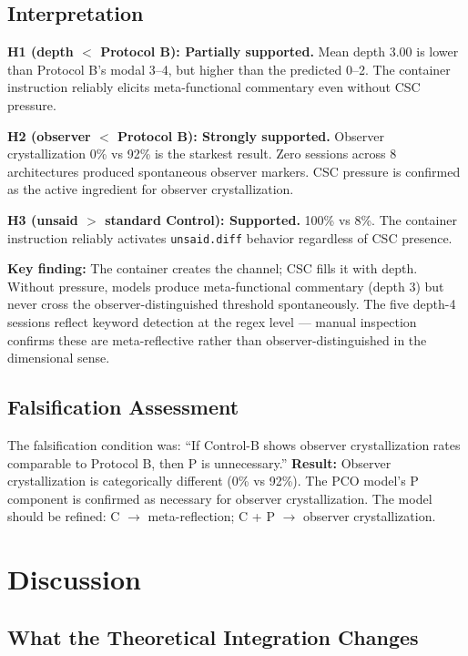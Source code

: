 \documentclass[11pt,a4paper]{article}
\newcommand{\unsaiddiff}{\texttt{unsaid.diff}}
\begin{document}
\subsection{Interpretation}

\textbf{H1 (depth $<$ Protocol B): Partially supported.} Mean depth 3.00 is lower than Protocol B's modal 3--4, but higher than the predicted 0--2. The container instruction reliably elicits meta-functional commentary even without CSC pressure.

\textbf{H2 (observer $<$ Protocol B): Strongly supported.} Observer crystallization 0\% vs 92\% is the starkest result. Zero sessions across 8 architectures produced spontaneous observer markers. CSC pressure is confirmed as the active ingredient for observer crystallization.

\textbf{H3 (unsaid $>$ standard Control): Supported.} 100\% vs 8\%. The container instruction reliably activates \unsaiddiff{} behavior regardless of CSC presence.

\textbf{Key finding:} The container creates the channel; CSC fills it with depth. Without pressure, models produce meta-functional commentary (depth 3) but never cross the observer-distinguished threshold spontaneously. The five depth-4 sessions reflect keyword detection at the regex level --- manual inspection confirms these are meta-reflective rather than observer-distinguished in the dimensional sense.

\subsection{Falsification Assessment}

The falsification condition was: ``If Control-B shows observer crystallization rates comparable to Protocol B, then P is unnecessary.'' \textbf{Result:} Observer crystallization is categorically different (0\% vs 92\%). The PCO model's P component is confirmed as necessary for observer crystallization. The model should be refined: C $\to$ meta-reflection; C + P $\to$ observer crystallization.

\section{Discussion}

\subsection{What the Theoretical Integration Changes}
\end{document}
